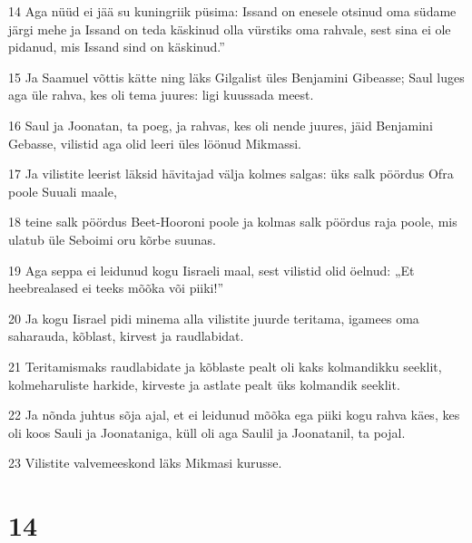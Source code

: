 \par 14 Aga nüüd ei jää su kuningriik püsima: Issand on enesele otsinud oma südame järgi mehe ja Issand on teda käskinud olla vürstiks oma rahvale, sest sina ei ole pidanud, mis Issand sind on käskinud.”
\par 15 Ja Saamuel võttis kätte ning läks Gilgalist üles Benjamini Gibeasse; Saul luges aga üle rahva, kes oli tema juures: ligi kuussada meest.
\par 16 Saul ja Joonatan, ta poeg, ja rahvas, kes oli nende juures, jäid Benjamini Gebasse, vilistid aga olid leeri üles löönud Mikmassi.
\par 17 Ja vilistite leerist läksid hävitajad välja kolmes salgas: üks salk pöördus Ofra poole Suuali maale,
\par 18 teine salk pöördus Beet-Hooroni poole ja kolmas salk pöördus raja poole, mis ulatub üle Seboimi oru kõrbe suunas.
\par 19 Aga seppa ei leidunud kogu Iisraeli maal, sest vilistid olid öelnud: „Et heebrealased ei teeks mõõka või piiki!”
\par 20 Ja kogu Iisrael pidi minema alla vilistite juurde teritama, igamees oma saharauda, kõblast, kirvest ja raudlabidat.
\par 21 Teritamismaks raudlabidate ja kõblaste pealt oli kaks kolmandikku seeklit, kolmeharuliste harkide, kirveste ja astlate pealt üks kolmandik seeklit.
\par 22 Ja nõnda juhtus sõja ajal, et ei leidunud mõõka ega piiki kogu rahva käes, kes oli koos Sauli ja Joonataniga, küll oli aga Saulil ja Joonatanil, ta pojal.
\par 23 Vilistite valvemeeskond läks Mikmasi kurusse.

\chapter{14}


